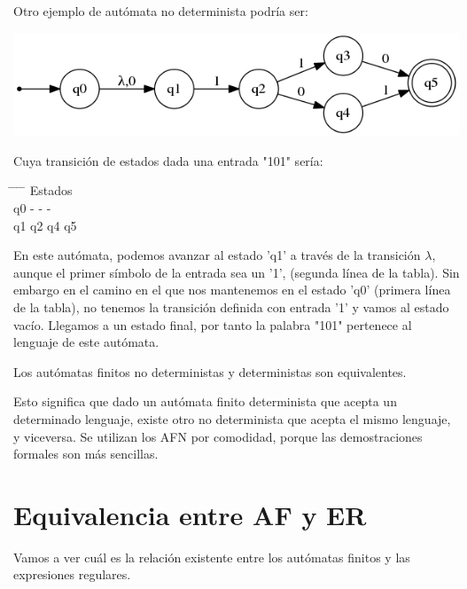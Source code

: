 \documentclass{apuntes}
\begin{document}
\begin{example}
Otro ejemplo de autómata no determinista podría ser:
\begin{center}
\includegraphics[scale=0.75]{automata3a.png}
\end{center}
Cuya transición de estados dada una entrada "101" sería:

 \begin{tabbing}
   \hspace*{2cm} \= \hspace*{2cm} \= \hspace*{2cm} \= \hspace*{2cm} \= \hspace*{2cm} \kill
 Estados          \\
 q0 \> - \> - \> -  \\
 q1 \> q2 \> q4 \> q5\\
 \end{tabbing}

En este autómata, podemos avanzar al estado 'q1'  a través de la transición $\lambda$, aunque el primer símbolo de la entrada sea un '1', (segunda línea de la tabla). Sin embargo en el camino en el que nos mantenemos en el estado 'q0'  (primera línea de la tabla), no tenemos la transición definida con entrada '1' y vamos al estado vacío. Llegamos a un estado final, por tanto la palabra "101" pertenece al lenguaje de este autómata.

\end{example}

\begin{theorem}
Los autómatas finitos no deterministas y deterministas son equivalentes.
\end{theorem}

Esto significa que dado un autómata finito determinista que acepta un determinado lenguaje, existe otro no determinista que acepta el mismo lenguaje, y viceversa. Se utilizan los AFN por comodidad, porque las demostraciones formales son más sencillas.

\section{Equivalencia entre AF y ER}
Vamos a ver cuál es la relación existente entre los autómatas finitos y las expresiones regulares.
\end{document}
